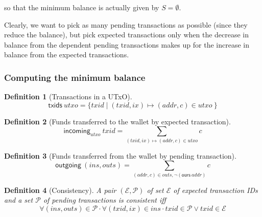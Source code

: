 \documentclass{article}
\newtheorem{definition}{Definition}
\begin{document}
\noindent
so that the minimum balance is actually given by $S = \emptyset$.

Clearly, we want to pick as many pending transactions as possible (since they
reduce the balance), but pick expected transactions only when the decrease in
balance from the dependent pending transactions makes up for the increase in
balance from the expected transactions.

\subsubsection{Computing the minimum balance}
\label{sec:computing_minimum_balance}

\begin{definition}[Transactions in a UTxO]
\begin{equation*}
  \mathsf{txids} ~ \mathit{utxo}
= \{ \mathit{txid} \mid (\mathit{txid}, \mathit{ix}) \mapsto (\mathit{addr}, c) \in \mathit{utxo} \ \}
\end{equation*}
\end{definition}

\begin{definition}[Funds transferred to the wallet by expected transaction]
\begin{equation*}
  \mathsf{incoming}_\mathit{utxo} ~ \mathit{txid}
= \sum_{(\mathit{txid}, \mathit{ix}) \mapsto (\mathit{addr}, c) \in \mathit{utxo}} c
\end{equation*}
\end{definition}

\begin{definition}[Funds transferred from the wallet by pending transaction]
\begin{equation*}
  \mathsf{outgoing} ~ (\mathit{ins}, \mathit{outs})
= \sum_{(\mathit{addr}, c) \in \mathit{outs}, \neg (\mathsf{ours} ~ \mathit{addr})} c
\end{equation*}
\end{definition}

\begin{definition}[Consistency]
A pair $(\mathcal{E}, \mathcal{P})$ of set $\mathcal{E}$ of expected transaction
IDs and a set $\mathcal{P}$ of pending transactions is \emph{consistent} iff
\begin{equation*}
\forall (\mathit{ins}, \mathit{outs}) \in \mathcal{P} \cdot
\forall (\mathit{txid}, \mathit{ix}) \in \mathit{ins} \cdot
\mathit{txid} \in \mathcal{P} \vee \mathit{txid} \in \mathcal{E}
\end{equation*}
\end{definition}
\end{document}
